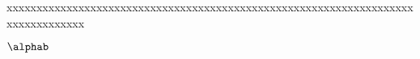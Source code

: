 \documentclass[12pt]{report}
\begin{document}
xxxxxxxxxxxxxxxxxxxxxxxxxxxxxxxxxxxxxxxxxxxxxxxxxxxxxxxxxxxxxxxxxxxxxxxxxxxxxxxxx

$\alphab$
\end{document}
